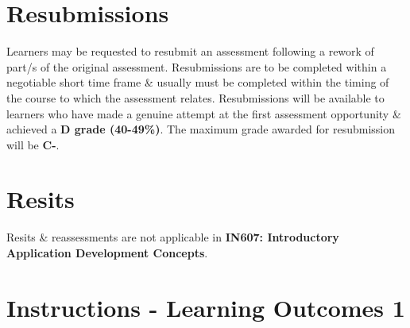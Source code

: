 \documentclass{article}
\begin{document}
\section*{Resubmissions}
Learners may be requested to resubmit an assessment following a rework of part/s of the original assessment. Resubmissions are to be completed within a negotiable short time frame \& usually must be completed within the timing of the course to which the assessment relates. Resubmissions will be available to learners who have made a genuine attempt at the first assessment opportunity \& achieved a \textbf{D grade (40-49\%)}. The maximum grade awarded for resubmission will be \textbf{C-}.

\section*{Resits}
Resits \& reassessments are not applicable in \textbf{IN607: Introductory Application Development Concepts}.

\section*{Instructions - Learning Outcomes 1}
\end{document}
